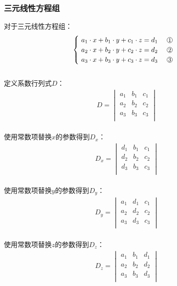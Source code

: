 \documentclass[UTF8]{ctexart}
\newcommand*{\circled}[1]{\lower.7ex\hbox{\tikz\draw (0pt, 0pt)circle (.4em) node {\makebox[0em][c]{\footnotesize #1}};}}
\begin{document}
\newpage

\subsubsection{三元线性方程组}
    \setcounter{equation}{0}
    对于三元线性方程组：
    \begin{align}
        \begin{cases}
            ~a_{1}\cdot x+b_{1}\cdot y+c_{1}\cdot z=d_{1}~~~~\circled{1}\\
            ~a_{2}\cdot x+b_{2}\cdot y+c_{2}\cdot z=d_{2}~~~~\circled{2}\\
            ~a_{3}\cdot x+b_{3}\cdot y+c_{3}\cdot z=d_{3}~~~~\circled{3}\\
        \end{cases}
    \end{align}\\
    定义系数行列式$D$：
    \begin{align}
        D=
        \begin{vmatrix}
            a_1&b_1&c_1\\
            a_2&b_2&c_2\\
            a_3&b_3&c_3\\
        \end{vmatrix}
    \end{align}\\
    使用常数项替换$x$的参数得到$D_x$：
    \begin{align}
        D_x=
        \begin{vmatrix}
            d_1&b_1&c_1\\
            d_2&b_2&c_2\\
            d_3&b_3&c_3\\
        \end{vmatrix}
    \end{align}\\
    使用常数项替换$y$的参数得到$D_y$：
    \begin{align}
        D_y=
        \begin{vmatrix}
            a_1&d_1&c_1\\
            a_2&d_2&c_2\\
            a_3&d_3&c_3\\
        \end{vmatrix}
    \end{align}\\
    使用常数项替换$z$的参数得到$D_z$：
    \begin{align}
        D_z=
        \begin{vmatrix}
            a_1&b_1&d_1\\
            a_2&b_2&d_2\\
            a_3&b_3&d_3\\
        \end{vmatrix}
    \end{align}\\
\end{document}

